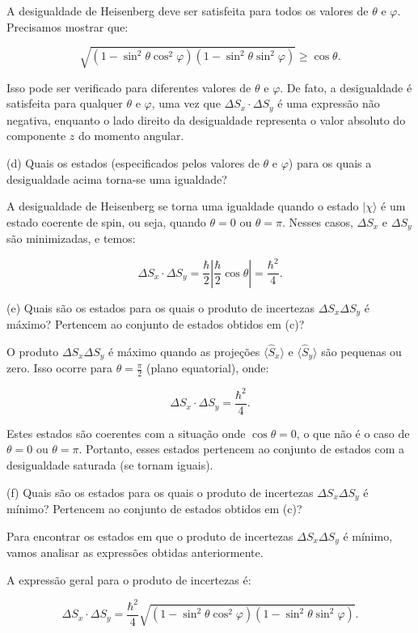 \documentclass[12pt]{article}
\begin{document}
\begin{enumerate}
A desigualdade de Heisenberg deve ser satisfeita para todos os valores de \(\theta\) e \(\varphi\). Precisamos mostrar que:

\[
\sqrt{(1 - \sin^2\theta \cos^2\varphi)(1 - \sin^2\theta \sin^2\varphi)} \geq \cos\theta.
\]

Isso pode ser verificado para diferentes valores de \(\theta\) e \(\varphi\). De fato, a desigualdade é satisfeita para qualquer \(\theta\) e \(\varphi\), uma vez que \(\Delta S_x \cdot \Delta S_y\) é uma expressão não negativa, enquanto o lado direito da desigualdade representa o valor absoluto do componente \(z\) do momento angular.

(d) Quais os estados (especificados pelos valores de $\theta$ e $\varphi$) para os quais a desigualdade acima torna-se uma igualdade?

A desigualdade de Heisenberg se torna uma igualdade quando o estado \(|\chi\rangle\) é um estado coerente de spin, ou seja, quando \( \theta = 0 \) ou \( \theta = \pi \). Nesses casos, \(\Delta S_x\) e \(\Delta S_y\) são minimizadas, e temos:

\[
\Delta S_x \cdot \Delta S_y = \frac{\hbar}{2} \left|\frac{\hbar}{2} \cos\theta \right| = \frac{\hbar^2}{4}.
\]

(e) Quais são os estados para os quais o produto de incertezas $\Delta S_x \Delta S_y$ é máximo? Pertencem ao conjunto de estados obtidos em (c)?

O produto \(\Delta S_x \Delta S_y\) é máximo quando as projeções \( \langle \hat{S}_x \rangle \) e \( \langle \hat{S}_y \rangle \) são pequenas ou zero. Isso ocorre para \(\theta = \frac{\pi}{2}\) (plano equatorial), onde:

\[
\Delta S_x \cdot \Delta S_y = \frac{\hbar^2}{4}.
\]

Estes estados são coerentes com a situação onde \(\cos\theta = 0\), o que não é o caso de \(\theta = 0\) ou \(\theta = \pi\). Portanto, esses estados pertencem ao conjunto de estados com a desigualdade saturada (se tornam iguais).

(f) Quais são os estados para os quais o produto de incertezas $\Delta S_x \Delta S_y$ é mínimo? Pertencem ao conjunto de estados obtidos em (c)?

Para encontrar os estados em que o produto de incertezas \(\Delta S_x \Delta S_y\) é mínimo, vamos analisar as expressões obtidas anteriormente.

A expressão geral para o produto de incertezas é:

\[
\Delta S_x \cdot \Delta S_y = \frac{\hbar^2}{4} \sqrt{(1 - \sin^2\theta \cos^2\varphi)(1 - \sin^2\theta \sin^2\varphi)}.
\]


\end{enumerate}
\end{document}
